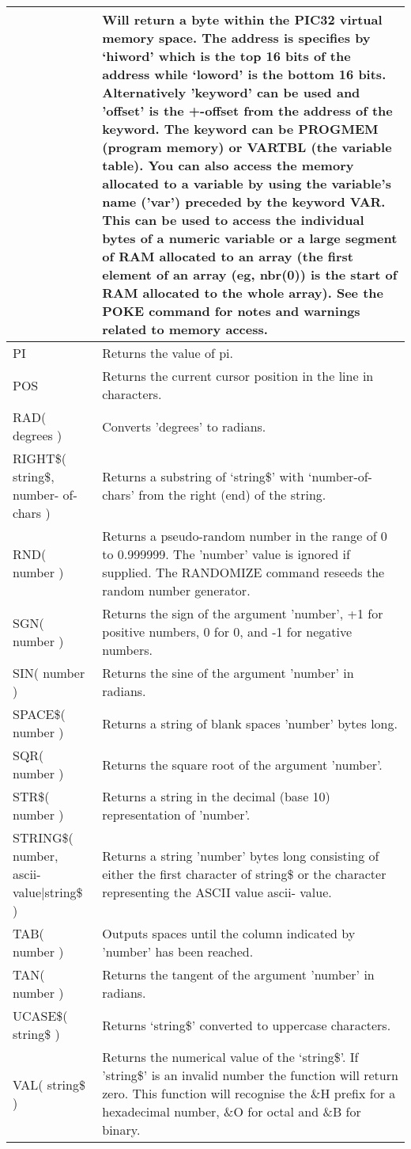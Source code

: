 \documentclass[11pt,fleqn]{book} %
\numberwithin{equation}{section} %
\numberwithin{figure}{section} %
\numberwithin{table}{section} %
\begin{document}
\begin{table}[]
\begin{tabular}{|p{4cm}|p{10cm}|}
& Will return a byte within the PIC32 virtual memory space.
The address is specifies by ‘hiword’ which is the top 16 bits of the
address while ‘loword’ is the bottom 16 bits.
Alternatively 'keyword' can be used and 'offset' is the +-offset from the
address of the keyword. The keyword can be 
PROGMEM (program
memory) or VARTBL (the variable table). 
You can also access the memory allocated to a variable by using the
variable's name ('var') preceded by the keyword VAR. This can be used
to access the individual bytes of a numeric variable or a large segment of
RAM allocated to an array (the first element of an array (eg, nbr(0)) is
the start of RAM allocated to the whole array).
See the POKE command for notes and warnings related to memory
access.
\\ \hline
PI & Returns the value of pi.
\\ \hline
POS & Returns the current cursor position in the line in characters.
\\ \hline
RAD( degrees ) & Converts 'degrees' to radians.
\\ \hline
RIGHT\$( string\$, number-
of-chars )
 & Returns a substring of ‘string\$’ with ‘number-of-chars’ from the right
(end) of the string.
\\ \hline
RND( number ) & Returns a pseudo-random number in the range of 0 to 0.999999. The
'number' value is ignored if supplied. The RANDOMIZE command
reseeds the random number generator.
\\ \hline
SGN( number ) & Returns the sign of the argument 'number', +1 for positive numbers, 0 for
0, and -1 for negative numbers.
\\ \hline
SIN( number ) & Returns the sine of the argument 'number' in radians.
\\ \hline
SPACE\$( number ) & Returns a string of blank spaces 'number' bytes long.
\\ \hline
SQR( number ) & Returns the square root of the argument 'number'.
\\ \hline
STR\$( number ) & Returns a string in the decimal (base 10) representation of 'number'.
\\ \hline
STRING\$( number, ascii-
value|string\$ )
 & Returns a string 'number' bytes long consisting of either the first
character of string\$ or the character representing the ASCII value ascii-
value.
\\ \hline
TAB( number ) & Outputs spaces until the column indicated by 'number' has been reached.
\\ \hline
TAN( number ) & Returns the tangent of the argument 'number' in radians.
\\ \hline
UCASE\$( string\$ ) & Returns ‘string\$’ converted to uppercase characters.
\\ \hline
VAL( string\$ ) & Returns the numerical value of the ‘string\$’. If 'string\$' is an invalid
number the function will return zero.
This function will recognise the \&H prefix for a hexadecimal number,
\&O for octal and \&B for binary.
\\ \hline
\end{tabular}
\end{table}
\end{document}
